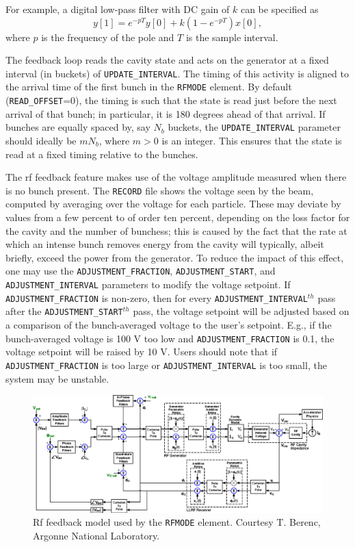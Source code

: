 For example, a digital low-pass filter with DC gain of $k$ can be specified as
\begin{equation}
y[1] = e^{-pT} y[0] + k (1 - e^{-pT}) x[0],
\end{equation}
where $p$ is the frequency of the pole and $T$ is the sample interval.

The feedback loop reads the cavity state and acts on the generator at a fixed interval (in buckets) of
\verb|UPDATE_INTERVAL|. 
The timing of this activity is aligned to the arrival time of the first bunch in the \verb|RFMODE| element.
By default (\verb|READ_OFFSET|=0), the timing is such that the state is read just before the next arrival of
that bunch; in particular, it is 180 degrees ahead of that arrival.
If bunches are equally spaced by, say $N_b$ buckets, the \verb|UPDATE_INTERVAL| parameter should ideally be
$m N_b$, where $m>0$ is an integer.
This ensures that the state is read at a fixed timing relative to the bunches.

The rf feedback feature makes use of the voltage amplitude measured when there is no bunch present.
The \verb|RECORD| file shows the voltage seen by the beam, computed by averaging over the voltage for
each particle.
These may deviate by values from a few percent to of order ten percent, depending on the loss factor for the
cavity and the number of bunchess; this is caused by the fact that the rate at which an intense bunch removes
energy from the cavity will typically, albeit briefly, exceed the power from the generator.
To reduce the impact of this effect, one may use the \verb|ADJUSTMENT_FRACTION|, \verb|ADJUSTMENT_START|, and \verb|ADJUSTMENT_INTERVAL|
parameters to modify the voltage setpoint.
If \verb|ADJUSTMENT_FRACTION| is non-zero, then for every \verb|ADJUSTMENT_INTERVAL|$^{th}$ pass after the 
\verb|ADJUSTMENT_START|$^{th}$ pass, the voltage setpoint will be adjusted based on a comparison of the bunch-averaged
voltage to the user's setpoint.
E.g., if the bunch-averaged voltage is 100 V too low and \verb|ADJUSTMENT_FRACTION| is 0.1, the voltage setpoint will
be raised by 10 V.
Users should note that if \verb|ADJUSTMENT_FRACTION| is too large or \verb|ADJUSTMENT_INTERVAL| is too small, the system
may be unstable.

\begin{figure}[htb]
\center
\includegraphics{rfFeedbackModel}
\caption{Rf feedback model used by the {\tt RFMODE} element. Courtesy T. Berenc, Argonne National Laboratory.}
\label{fig:rfFeedbackModel}
\end{figure}

